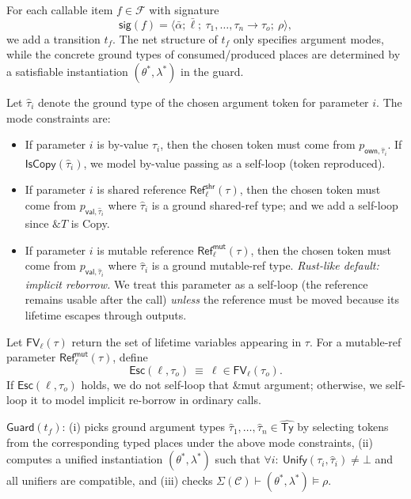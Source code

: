 \documentclass[sigconf]{acmart}
\begin{document}
For each callable item $f\in\mathcal{F}$ with signature
\begin{equation*}
    \mathsf{sig}(f)=\langle \bar\alpha;\bar\ell;\ \tau_1,\dots,\tau_n \to \tau_o;\ \rho\rangle,
\end{equation*}
we add a transition $t_f$.
The net structure of $t_f$ only specifies argument modes, while the concrete ground types of consumed/produced places are determined by a satisfiable instantiation $(\theta^{*},\lambda^{*})$ in the guard.

Let $\hat\tau_i$ denote the ground type of the chosen argument token for parameter $i$.
The mode constraints are:
\begin{itemize}
\item If parameter $i$ is by-value $\tau_i$, then the chosen token must come from
      $p_{\mathsf{own},\hat\tau_i}$.
      If $\mathsf{IsCopy}(\hat\tau_i)$, we model by-value passing as a self-loop (token reproduced).
\item If parameter $i$ is shared reference $\mathsf{Ref}^{\mathsf{shr}}_{\ell}(\tau)$, then the chosen token must come from
      $p_{\mathsf{val},\hat\tau_i}$ where $\hat\tau_i$ is a ground shared-ref type; and we add a self-loop since $\&T$ is Copy.
\item If parameter $i$ is mutable reference $\mathsf{Ref}^{\mathsf{mut}}_{\ell}(\tau)$, then the chosen token must come from
      $p_{\mathsf{val},\hat\tau_i}$ where $\hat\tau_i$ is a ground mutable-ref type.
      \emph{Rust-like default: implicit reborrow.}
      We treat this parameter as a self-loop (the reference remains usable after the call)
      \emph{unless} the reference must be moved because its lifetime escapes through outputs.
\end{itemize}

Let $\mathsf{FV}_{\ell}(\tau)$ return the set of lifetime variables appearing in $\tau$.
For a mutable-ref parameter $\mathsf{Ref}^{\mathsf{mut}}_{\ell}(\tau)$, define
\begin{equation*}
    \mathsf{Esc}(\ell, \tau_o) ~\equiv~ \ell\in \mathsf{FV}_{\ell}(\tau_o).
\end{equation*}
If $\mathsf{Esc}(\ell,\tau_o)$ holds, we do not self-loop that \&mut argument;
otherwise, we self-loop it to model implicit re-borrow in ordinary calls.

$\mathsf{Guard}(t_f)$:
(i) picks ground argument types $\hat\tau_1,\dots,\hat\tau_n\in\widehat{\mathsf{Ty}}$ by selecting tokens from the corresponding
typed places under the above mode constraints,
(ii) computes a unified instantiation $(\theta^{*},\lambda^{*})$ such that
$\forall i:\ \mathsf{Unify}(\tau_i,\hat\tau_i)\neq\bot$ and all unifiers are compatible, and
(iii) checks $\Sigma(\mathcal{C})\vdash (\theta^{*},\lambda^{*})\models\rho$.
\end{document}
